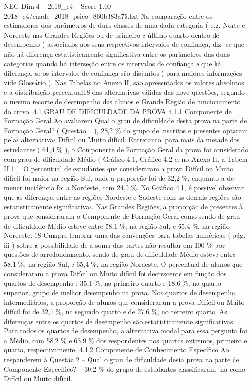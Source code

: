 \begin{textsample}{NEG Dim 4 – 2018\_c4 – Score 1.00 – 2018\_c4/enade\_2018\_psico\_860b383a75.txt}
Na comparação entre os estimadores dos parâmetros de duas classes de uma dada categoria ( e.g.
Norte e Nordeste nas Grandes Regiões ou de primeiro e último quarto dentro de desempenho ) associados aos seus respectivos intervalos de confiança, diz -se que não há diferença estatisticamente significativa entre os parâmetros das duas categorias quando há interseção entre os intervalos de confiança e que há diferença, se os intervalos de confiança são disjuntos ( para maiores informações vide Glossário ).
Nas Tabelas no Anexo II, são apresentados os valores absolutos e a distribuição percentual18 das alternativas válidas das nove questões, segundo o mesmo recorte de desempenho dos alunos e Grande Região de funcionamento do curso. 4.1 GRAU DE DIFICULDADE DA PROVA 4.1.1 Componente de Formação Geral Ao avaliarem Qual o grau de dificuldade desta prova na parte de Formação Geral? ( Questão 1 ), 28,2 \% do grupo de inscritos e presentes optaram pelas alternativas Difícil ou Muito difícil.
Entretanto, para mais da metade dos estudantes ( 61,4 \% ), o Componente de Formação Geral da prova foi considerado com grau de dificuldade Médio ( Gráfico 4.1, Gráfico 4.2 e, no Anexo II, a Tabela II.1 ).
O percentual de estudantes que consideraram a prova Difícil ou Muito difícil foi maior na região Sul, onde a proporção foi de 32,2 \%, enquanto a de menor incidência foi a Nordeste, com 24,0 \%.
No Gráfico 4.1, é possível observar que as diferenças entre as regiões Nordeste e Sudeste com as demais regiões são estatisticamente significativas.
Nas Grandes Regiões, a proporção de presentes à prova que consideraram o Componente de Formação Geral como sendo de grau de dificuldade Médio esteve entre 58,1 \%, na região Sul, e 65,4 \%, na região Nordeste. 18 Cumpre lembrar uma das convenções para tabelas numéricas ( pág. iii ) sobre a possibilidade de a soma das partes não resultar em 100 \% por questões de arredondamento. sendo de grau de dificuldade Médio esteve entre 58,1 \%, na região Sul, e 65,4 \%, na região Nordeste.
O percentual de alunos que consideraram a prova Difícil ou Muito difícil foi decrescente em função dos quartos de desempenho : 35,1 \%, no primeiro quarto e 18,6 \%, no quarto superior, grupo de melhor desempenho na prova.
Nos quartos de desempenho intermediários, a proporção de alunos que consideraram a prova Difícil ou Muito difícil foi de 32,1 \%, no segundo quarto e de 27,6 \%, no terceiro quarto.
As diferenças entre os quartos de desempenho são estatisticamente significativas.
Para todos os quartos de desempenho, a alternativa modal para essa pergunta foi a Médio, com 58,2 \% e 63,9 \% dos respondentes nos quartos extremos, primeiro e quarto, respectivamente. 4.1.2 Componente de Conhecimento Específico Ao responderem à Questão 2 – Qual o grau de dificuldade desta prova na parte de Componente Específico? – 30,2 \% do grupo de estudantes classificaram -na como Difícil ou Muito difícil.

\end{textsample}
